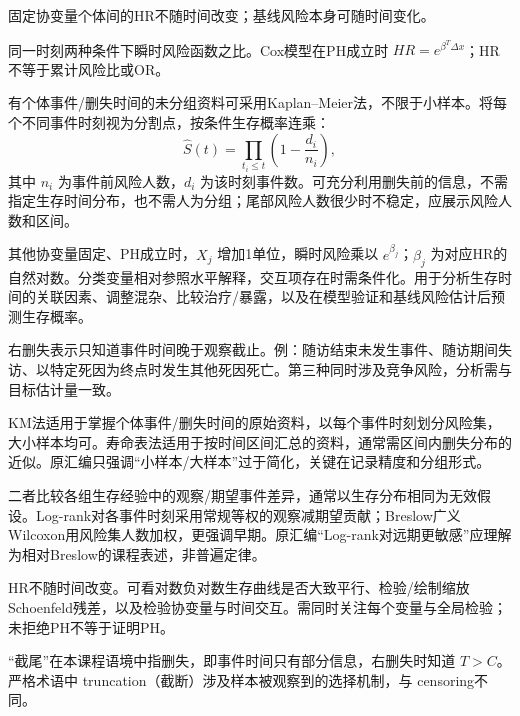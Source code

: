 
固定协变量个体间的HR不随时间改变；基线风险本身可随时间变化。



同一时刻两种条件下瞬时风险函数之比。Cox模型在PH成立时 \(HR=e^{\beta^T\Delta x}\)；HR不等于累计风险比或OR。



有个体事件/删失时间的未分组资料可采用Kaplan--Meier法，不限于小样本。将每个不同事件时刻视为分割点，按条件生存概率连乘： \[\hat S(t)=\prod_{t_i\le t}\left(1-\frac{d_i}{n_i}\right),\] 其中 \(n_i\) 为事件前风险人数，\(d_i\) 为该时刻事件数。可充分利用删失前的信息，不需指定生存时间分布，也不需人为分组；尾部风险人数很少时不稳定，应展示风险人数和区间。



其他协变量固定、PH成立时，\(X_j\) 增加1单位，瞬时风险乘以 \(e^{\beta_j}\)；\(\beta_j\) 为对应HR的自然对数。分类变量相对参照水平解释，交互项存在时需条件化。用于分析生存时间的关联因素、调整混杂、比较治疗/暴露，以及在模型验证和基线风险估计后预测生存概率。



右删失表示只知道事件时间晚于观察截止。例：随访结束未发生事件、随访期间失访、以特定死因为终点时发生其他死因死亡。第三种同时涉及竞争风险，分析需与目标估计量一致。



KM法适用于掌握个体事件/删失时间的原始资料，以每个事件时刻划分风险集，大小样本均可。寿命表法适用于按时间区间汇总的资料，通常需区间内删失分布的近似。原汇编只强调``小样本/大样本''过于简化，关键在记录精度和分组形式。



二者比较各组生存经验中的观察/期望事件差异，通常以生存分布相同为无效假设。Log-rank对各事件时刻采用常规等权的观察减期望贡献；Breslow广义Wilcoxon用风险集人数加权，更强调早期。原汇编``Log-rank对远期更敏感''应理解为相对Breslow的课程表述，非普遍定律。



HR不随时间改变。可看对数负对数生存曲线是否大致平行、检验/绘制缩放Schoenfeld残差，以及检验协变量与时间交互。需同时关注每个变量与全局检验；未拒绝PH不等于证明PH。



``截尾''在本课程语境中指删失，即事件时间只有部分信息，右删失时知道 \(T>C\)。严格术语中 truncation（截断）涉及样本被观察到的选择机制，与 censoring不同。

